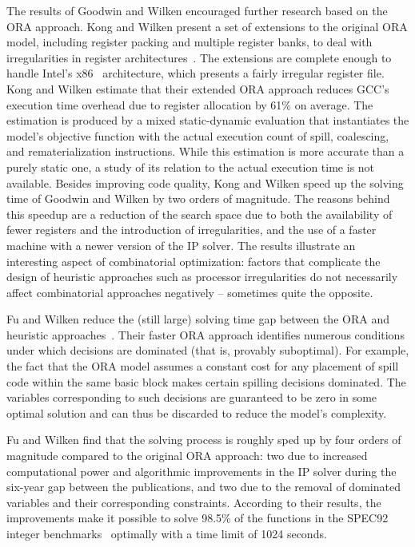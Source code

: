 \documentclass[acmsmall,authorversion,nonacm]{acmart}
\begin{document}
The results of Goodwin and Wilken encouraged further research based on
the ORA approach.
Kong and Wilken present a set of extensions to the original ORA model,
including register packing and multiple register banks, to
deal with irregularities in register architectures~\cite{Kong1998}.
The extensions are complete enough to handle Intel's x86~\cite{x86}
architecture, which presents a fairly irregular register file.
Kong and Wilken estimate that their extended ORA approach reduces
GCC's execution time overhead due to register allocation by 61\% on
average.
The estimation is produced by a mixed static-dynamic evaluation that
instantiates the model's objective function with the actual execution
count of spill, coalescing, and rematerialization instructions.
While this estimation is more accurate than a purely static one, a
study of its relation to the actual execution time is not available.
Besides improving code quality, Kong and Wilken speed up the solving
time of Goodwin and Wilken by two orders of magnitude.
The reasons behind this speedup are a reduction of the search space
due to both the availability of fewer registers and the introduction
of irregularities, and the use of a faster machine with a newer
version of the IP solver.
The results illustrate an interesting aspect of combinatorial
optimization: factors that complicate the design of heuristic
approaches such as processor irregularities do not necessarily affect
combinatorial approaches negatively -- sometimes quite the opposite.

Fu and Wilken reduce the (still large) solving time gap between the
ORA and heuristic approaches~\cite{Fu2002}.
Their faster ORA approach identifies numerous conditions under which
decisions are dominated (that is, provably suboptimal).
For example, the fact that the ORA model assumes a constant cost for
any placement of spill code within the same basic block makes certain
spilling decisions dominated.
The variables corresponding to such decisions are guaranteed to be
zero in some optimal solution and can thus be discarded to reduce the
model's complexity.

Fu and Wilken find that the solving process is roughly sped up by four
orders of magnitude compared to the original ORA approach: two due to
increased computational power and algorithmic improvements in the IP
solver during the six-year gap between the publications, and two due
to the removal of dominated variables and their corresponding
constraints.
According to their results, the improvements make it possible to solve
98.5\% of the functions in the SPEC92 integer benchmarks~\cite{CPU}
optimally with a time limit of 1024 seconds.
\end{document}
